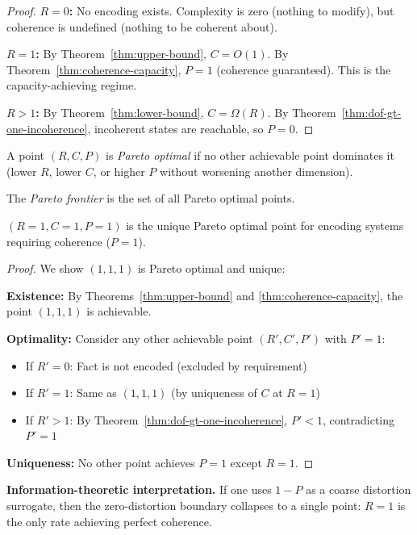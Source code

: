 \begin{proof}
\textbf{$R = 0$:} No encoding exists. Complexity is zero (nothing to modify), but coherence is undefined (nothing to be coherent about).

\textbf{$R = 1$:} By Theorem~\ref{thm:upper-bound}, $C = O(1)$. By Theorem~\ref{thm:coherence-capacity}, $P = 1$ (coherence guaranteed). This is the capacity-achieving regime.

\textbf{$R > 1$:} By Theorem~\ref{thm:lower-bound}, $C = \Omega(R)$. By Theorem~\ref{thm:dof-gt-one-incoherence}, incoherent states are reachable, so $P = 0$.
\end{proof}

\begin{definition}\label{def:pareto-frontier}
A point $(R, C, P)$ is \emph{Pareto optimal} if no other achievable point dominates it (lower $R$, lower $C$, or higher $P$ without worsening another dimension).

The \emph{Pareto frontier} is the set of all Pareto optimal points.
\end{definition}

\begin{theorem}[Pareto Optimality of DOF = 1]\label{thm:pareto-optimal}
$(R=1, C=1, P=1)$ is the unique Pareto optimal point for encoding systems requiring coherence ($P = 1$).
\end{theorem}

\begin{proof}
We show $(1, 1, 1)$ is Pareto optimal and unique:

\textbf{Existence:} By Theorems~\ref{thm:upper-bound} and \ref{thm:coherence-capacity}, the point $(1, 1, 1)$ is achievable.

\textbf{Optimality:} Consider any other achievable point $(R', C', P')$ with $P' = 1$:
\begin{itemize}
\tightlist
\item If $R' = 0$: Fact is not encoded (excluded by requirement)
\item If $R' = 1$: Same as $(1, 1, 1)$ (by uniqueness of $C$ at $R=1$)
\item If $R' > 1$: By Theorem~\ref{thm:dof-gt-one-incoherence}, $P' < 1$, contradicting $P' = 1$
\end{itemize}

\textbf{Uniqueness:} No other point achieves $P = 1$ except $R = 1$.
\end{proof}

\textbf{Information-theoretic interpretation.} If one uses $1-P$ as a coarse distortion surrogate, then the zero-distortion boundary collapses to a single point: $R=1$ is the only rate achieving perfect coherence.

